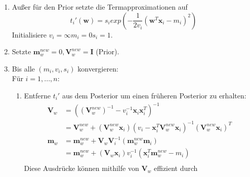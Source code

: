 \documentclass[12pt,a4paper]{scrartcl}
\numberwithin{equation}{section}
\begin{document}
{  \begin{enumerate}
   \item Außer für den Prior setzte die Termapproximationen auf
   \begin{equation}
    t_i'(\mathbf{w}) = s_i exp(- \frac{1}{2 v_i}(\mathbf{w}^T \mathbf{x}_i - m_i)^2)
   \end{equation}
   Initialisiere $v_i = \infty m _i = 0 s_i = 1$.
   \item Setzte $\mathbf{m}_w^{new} = 0, \mathbf{V}_w^{new} = \mathbf{I}$ (Prior).
   \item Bis alle $(m_i,v_i,s_i)$ konvergieren: \\
   Für $i = 1,...,n:$
   \begin{enumerate}
    \item Entferne $t_i'$ aus dem Posterior um einen früheren Posterior zu erhalten: 
    \begin{equation}
    \begin{split}
     \mathbf{V}_w &= ( (\mathbf{V}_w^{new})^{-1} - v_i^{-1} \mathbf{x}_i \mathbf{x}_i^T )^{-1} \\
     &= \mathbf{V}_w^{new} + (\mathbf{V}_w^{new} \mathbf{x}_i) ( v_i - \mathbf{x}_i^T \mathbf{V}_w^{new}\mathbf{x}_i )^{-1} (\mathbf{V}_w^{new} \mathbf{x}_i)^T \\
     \mathbf{m}_w &= \mathbf{m}_w^{new} + \mathbf{V}_w \mathbf{V}_i^{-1} (\mathbf{m}_w^{new} \mathbf{m}_i) \\
     &= \mathbf{m}_w^{new} + (\mathbf{V}_w \mathbf{x}_i) v_i^{-1} (\mathbf{x}_i^T \mathbf{m}_w^{new} - m_i) \\
     \end{split}
    \end{equation}
    Diese Ausdrücke können mithilfe von $\mathbf{V}_w$ effizient durch
    

\end{enumerate}
\end{enumerate}}
\end{document}
